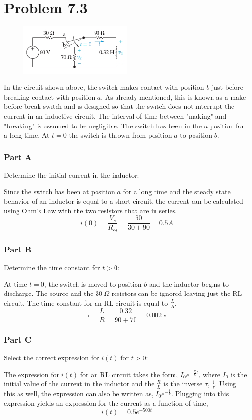 \documentclass[12pt]{article}
\begin{document}
    \section*{Problem 7.3}
    \begin{figure}[h]
        \centering
        \includegraphics[width=0.5\textwidth]{7.3 Figure.png}
    \end{figure}
    \par In the circuit shown above, the switch makes contact with position $b$ just before breaking contact with position $a$. As already mentioned, this is known as a make-before-break switch and is designed so that the switch does not interrupt the current in an inductive circuit. The interval of time between "making" and "breaking" is assumed to be negligible. The switch has been in the $a$ position for a long time. At $t = 0$ the switch is thrown from position $a$ to position $b$.
    \subsubsection*{Part A} Determine the initial current in the inductor: \\
    \par Since the switch has been at position $a$ for a long time and the steady state behavior of an inductor is equal to a short circuit, the current can be calculated using Ohm's Law with the two resistors that are in series.
    \[
        i(0) = \frac{V_s}{R_{eq}} = \frac{60}{30 + 90} = \boxed{0.5 A}
    \]
    \subsubsection*{Part B} Determine the time constant for $t > 0$: \\
    \par At time $t = 0$, the switch is moved to position $b$ and the inductor begins to discharge. The source and the $30\ \Omega$ resistors can be ignored leaving just the RL circuit. The time constant for an RL circuit is equal to
    $\frac{L}{R}$.
    \[
        \tau = \frac{L}{R} = \frac{0.32}{90+70} = \boxed{0.002\ s}
    \]
    \subsubsection*{Part C} Select the correct expression for $i(t)$ for $t > 0$: \\
    \par The expression for $i(t)$ for an RL circuit takes the form, $I_0e^{-\frac{R}{L}t}$, where $I_0$ is the initial value of the current in the inductor and the $\frac{R}{L}$ is the inverse $\tau$, $\frac{1}{\tau}$. Using this as well, the expression can also be written as, $I_0e^{-\frac{t}{\tau}}$. Plugging into this expression yields an expression for the current as a function of time,
    \[
        \boxed{i(t) = 0.5e^{-500t}}
    \]
\end{document}
